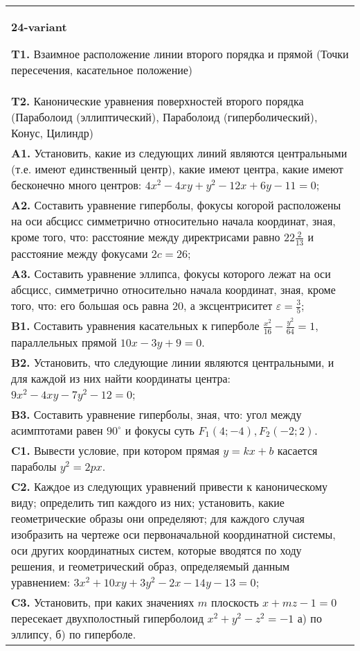 \documentclass{article}
\begin{document}
\begin{tabular}{m{17cm}}
\textbf{24-variant}
\newline

\textbf{T1.} Взаимное расположение линии второго порядка и прямой (Точки пересечения, касательное положение) \\
\textbf{T2.} Канонические уравнения поверхностей второго порядка (Параболоид (эллиптический), Параболоид (гиперболический), Конус, Цилиндр) \\
\textbf{A1.} Установить, какие из следующих линий являются центральными (т.е. имеют единственный центр), какие имеют центра, какие имеют бесконечно много центров: $4 x^2-4 x y+y^2-12 x+6 y-11=0$; \\
\textbf{A2.} Составить уравнение гиперболы, фокусы когорой расположены на оси абсцисс симметрично относительно начала координат, зная, кроме того, что: расстояние между директрисами равно $22 \frac{2}{13}$ и расстояние между фокусами $2 c=26$; \\
\textbf{A3.} Составить уравнение эллипса, фокусы которого лежат на оси абсцисс, симметрично относительно начала координат, зная, кроме того, что: его большая ось равна 20, а эксцентриситет $\varepsilon=\frac{3}{5}$; \\
\textbf{B1.} Составить уравнения касательных к гиперболе $\frac{x^2}{16}-\frac{y^2}{64}=1$, параллельных прямой $10 x-3 y+9=0$. \\
\textbf{B2.} Установить, что следующие линии являются центральными, и для каждой из них найти координаты центра: $9 x^2-4 x y-7 y^2-12=0$; \\
\textbf{B3.} Составить уравнение гиперболы, зная, что: угол между асимптотами равен $90^{\circ}$ и фокусы суть $F_1(4 ;-4), F_2(-2 ; 2)$. \\
\textbf{C1.} Вывести условие, при котором прямая $y=k x+b$ касается параболы $y^2=2 p x$. \\
\textbf{C2.} Каждое из следующих уравнений привести к каноническому виду; определить тип каждого из них; установить, какие геометрические образы они определяют; для каждого случая изобразить на чертеже оси первоначальной координатной системы, оси других координатных систем, которые вводятся по ходу решения, и геометрический образ, определяемый данным уравнением: $3 x^2+10 x y+3 y^2-2 x-14 y-13=0$; \\
\textbf{C3.} Установить, при каких значениях $m$ плоскость $x+m z-1=0$ пересекает двухполостный гиперболоид $x^2+y^2-z^2=-1$ а) по эллипсу, б) по гиперболе. \\

\end{tabular}
\vspace{1cm}
\end{document}
